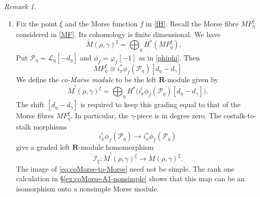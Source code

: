\documentclass[11pt,reqno]{amsart}
\theoremstyle{definition}
\theoremstyle{remark}
\newtheorem{Remark}[Theorem]{Remark}
\def\bR{\mathbf R}
\begin{document}
\begin{Remark}
\begin{enumerate}[label=$\mathrm{(\alph*)}$,leftmargin=8mm]
\item
Fix the point $\xi$ and the Morse function $f$ in \eqref{fH}.
Recall the Morse fibre $MF^\xi_\eta$ considered in \eqref{MF}.
Its cohomology is finite dimensional. We have
\[
\mathring M(\rho,\gamma)^\xi
 =\bigoplus_\eta H^*(MF^\xi_\eta),\quad
\]
 Put
$\mathcal P_\eta=\mathscr L_\eta[-d_\eta]$
and $\phi_f=\varphi_f[-1]$ as in \eqref{phiphi}. Then
\[
MF^\xi_\eta
 \cong i_x^*\phi_f(\mathcal P_\eta)[d_\eta-d_\gamma]
\]
We define the \emph{co-Morse module} to be the left $\bR$-module given by
\[
 \mathring M^{!}(\rho,\gamma)^\xi
 =\bigoplus_\eta
 H^*\bigl(i_x^!\phi_f(\mathcal P_\eta)
                  [d_\eta-d_\gamma]\bigr).
\]
The shift $[d_\eta-d_\gamma]$ is required to keep
this grading equal to that of the Morse fibres $MF^\xi_\eta$.
In particular, the $\gamma$-piece is in degree zero.
The costalk-to-stalk morphisms
\[
 i_x^!\phi_f(\mathcal P_\eta)
 \longrightarrow i_x^*\phi_f(\mathcal P_\eta)
\]
give a graded left $\bR$-module homomorphism
\begin{equation}\label{eq:coMorse-to-Morse}
 \mathring{\mathcal I}_\xi:\mathring M^!(\rho,\gamma)^\xi
       \longrightarrow \mathring M(\rho,\gamma)^\xi.
\end{equation}
The image of
\eqref{eq:coMorse-to-Morse} need not be simple.
The rank one calculation in
\S\ref{ex:coMorse-A1-nonsimple} shows that this
map can be an isomorphism onto a nonsimple Morse module.


\end{enumerate}
\end{Remark}
\end{document}
